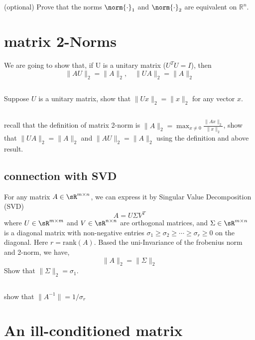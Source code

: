 \documentclass{article}%
\begin{document}
\subsection{}
(optional) Prove that the norms $\norm{\cdot}_{1}$ and $\norm{\cdot}_{2}$ are equivalent on $\mathbb{R}^n$.



\section{ matrix 2-Norms}

We are going to show that, if U is a unitary matrix ($U^TU=I$), then
$$
\|AU\|_2=\|A\|_2,\quad \|UA\|_2=\|A\|_2
$$

\subsection{}
Suppose $U$ is a unitary matrix, show that $\|Ux\|_2=\|x\|_2$ for any vector $x$.

\subsection{}
recall that the definition of matrix 2-norm is $\|A\|_2=\max_{x\neq 0}\frac{\|Ax\|_2}{\|x\|_2}$, show that $\|UA\|_2=\|A\|_2$ and $\|AU\|_2=\|A\|_2$ using the definition and above result.
\subsection{connection with SVD}
For any matrix $A\in \sR^{m\times n}$, we can express it by Singular Value Decomposition (SVD)
\[
A = U \Sigma V^T
\]
where $U\in \sR^{m\times m}$ and $V\in \sR^{n\times n}$ are orthogonal matrices, and $\Sigma\in \sR^{m\times n}$ is a diagonal matrix with non-negative entries $\sigma_1\geq \sigma_2\geq \cdots \geq \sigma_r\geq 0$ on the diagonal. Here $r=\text{rank}(A)$.
Based the uni-Invariance of the frobenius norm and 2-norm, we have,
$$
\|A\|_2=\|\Sigma\|_2
$$
Show that $\|\Sigma\|_2=\sigma_1$.

\subsection{}
show that $\|A^{-1}\|=1/\sigma_r$


\section{An ill-conditioned matrix}
\end{document}
